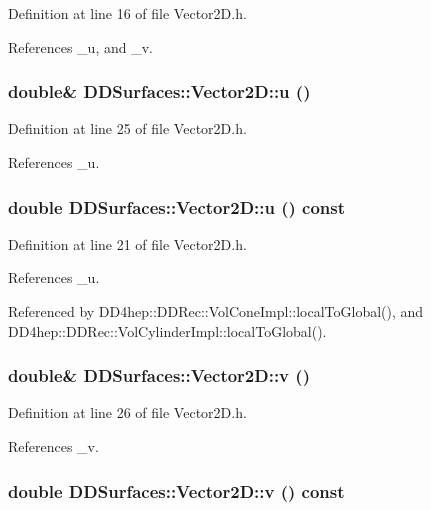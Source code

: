 Definition at line 16 of file Vector2D.h.

References \_\-u, and \_\-v.\hypertarget{class_d_d_surfaces_1_1_vector2_d_a366947f28bc5da5b5581186158321489}{
\subsubsection[{u}]{\setlength{\rightskip}{0pt plus 5cm}double\& DDSurfaces::Vector2D::u ()}}
\label{class_d_d_surfaces_1_1_vector2_d_a366947f28bc5da5b5581186158321489}


Definition at line 25 of file Vector2D.h.

References \_\-u.\hypertarget{class_d_d_surfaces_1_1_vector2_d_a5b394ade28f5c03eaa174902de6fe079}{
\subsubsection[{u}]{\setlength{\rightskip}{0pt plus 5cm}double DDSurfaces::Vector2D::u () const}}
\label{class_d_d_surfaces_1_1_vector2_d_a5b394ade28f5c03eaa174902de6fe079}


Definition at line 21 of file Vector2D.h.

References \_\-u.

Referenced by DD4hep::DDRec::VolConeImpl::localToGlobal(), and DD4hep::DDRec::VolCylinderImpl::localToGlobal().\hypertarget{class_d_d_surfaces_1_1_vector2_d_aff280a5b8f8a363199965bc609a02ee0}{
\subsubsection[{v}]{\setlength{\rightskip}{0pt plus 5cm}double\& DDSurfaces::Vector2D::v ()}}
\label{class_d_d_surfaces_1_1_vector2_d_aff280a5b8f8a363199965bc609a02ee0}


Definition at line 26 of file Vector2D.h.

References \_\-v.\hypertarget{class_d_d_surfaces_1_1_vector2_d_a146ba717d65ee406f9fa799780e97974}{
\subsubsection[{v}]{\setlength{\rightskip}{0pt plus 5cm}double DDSurfaces::Vector2D::v () const}}
\label{class_d_d_surfaces_1_1_vector2_d_a146ba717d65ee406f9fa799780e97974}


